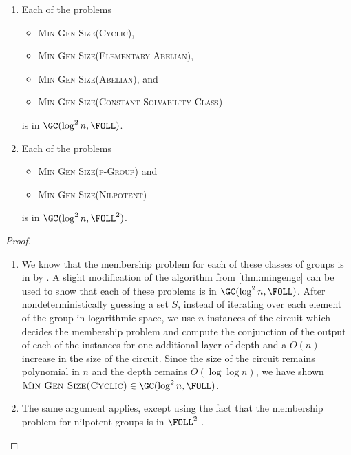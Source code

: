 \documentclass{article}
\begin{document}
\begin{theorem}
  \mbox{}
  \begin{enumerate}
  \item Each of the problems
    \begin{itemize}
    \item \textsc{Min Gen Size(Cyclic)},
    \item \textsc{Min Gen Size(Elementary Abelian)},
    \item \textsc{Min Gen Size(Abelian)}, and
    \item \textsc{Min Gen Size(Constant Solvability Class)}
    \end{itemize}
    is in $\GC(\log^2 n, \FOLL)$.
  \item Each of the problems
    \begin{itemize}
    \item \textsc{Min Gen Size(p-Group)} and
    \item \textsc{Min Gen Size(Nilpotent)}
    \end{itemize}
    is in $\GC(\log^2 n, \FOLL^2)$.
  \end{enumerate}
\end{theorem}
\begin{proof}
  \mbox{}
  \begin{enumerate}
  \item
    We know that the membership problem for each of these classes of groups is in \FOLL{} by \cite[Section~3]{bklm01}.
    A slight modification of the algorithm from \autoref{thm:mingengc} can be used to show that each of these problems is in $\GC(\log^2 n, \FOLL)$.
    After nondeterministically guessing a set $S$, instead of iterating over each element of the group in logarithmic space, we use $n$ instances of the \FOLL{} circuit which decides the membership problem and compute the conjunction of the output of each of the instances for one additional layer of depth and a $O(n)$ increase in the size of the circuit.
    Since the size of the circuit remains polynomial in $n$ and the depth remains $O(\log \log n)$, we have shown $\textsc{Min Gen Size(Cyclic)} \in \GC(\log^2 n, \FOLL)$.
  \item The same argument applies, except using the fact that the membership problem for nilpotent groups is in $\FOLL^2$ \cite[Corollary~3.12]{bklm01}. \qedhere
  \end{enumerate}
\end{proof}
\end{document}
